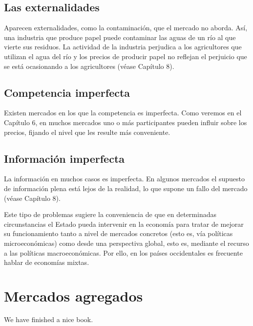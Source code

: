\documentclass[
]{krantz}
\begin{document}
\hypertarget{las-externalidades}{%
\section{Las externalidades}\label{las-externalidades}}

Aparecen externalidades, como la contaminación, que el mercado no aborda. Así, una industria que produce papel puede contaminar las aguas de un río al que vierte sus residuos. La actividad de la industria perjudica a los agricultores que utilizan el agua del río y los precios de producir papel no reflejan el perjuicio que se está ocasionando a los agricultores (véase Capítulo 8).

\hypertarget{competencia-imperfecta}{%
\section{Competencia imperfecta}\label{competencia-imperfecta}}

Existen mercados en los que la competencia es imperfecta. Como veremos en el Capítulo 6, en muchos mercados uno o más participantes pueden influir sobre los precios, fijando el nivel que les resulte más conveniente.

\hypertarget{informaciuxf3n-imperfecta}{%
\section{Información imperfecta}\label{informaciuxf3n-imperfecta}}

La información en muchos casos es imperfecta. En algunos mercados el supuesto de información plena está lejos de la realidad, lo que supone un fallo del mercado (véase Capítulo 8).

Este tipo de problemas sugiere la conveniencia de que en determinadas circunstancias el Estado pueda intervenir en la economía para tratar de mejorar su funcionamiento tanto a nivel de mercados concretos (esto es, vía políticas microeconómicas) como desde una perspectiva global, esto es, mediante el recurso a las políticas macroeconómicas. Por ello, en los países occidentales es frecuente hablar de economías mixtas.

\hypertarget{mercados-agregados}{%
\chapter{Mercados agregados}\label{mercados-agregados}}

We have finished a nice book.

  
\end{document}
